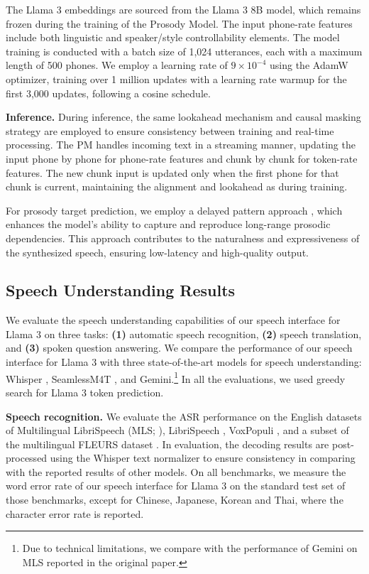 The Llama 3 embeddings are sourced from the Llama 3 8B model, which remains frozen during the training of the Prosody Model. The input phone-rate features include both linguistic and speaker/style controllability elements. The model training is conducted with a batch size of 1,024 utterances, each with a maximum length of 500 phones. We employ a learning rate of \(9 \times 10^{-4}\) using the AdamW optimizer, training over 1 million updates with a learning rate warmup for the first 3,000 updates, following a cosine schedule.

\textbf{Inference.} During inference, the same lookahead mechanism and causal masking strategy are employed to ensure consistency between training and real-time processing. The PM handles incoming text in a streaming manner, updating the input phone by phone for phone-rate features and chunk by chunk for token-rate features. The new chunk input is updated only when the first phone for that chunk is current, maintaining the alignment and lookahead as during training.

For prosody target prediction, we employ a delayed pattern approach \citep{kharitonov2021text}, which enhances the model’s ability to capture and reproduce long-range prosodic dependencies. This approach contributes to the naturalness and expressiveness of the synthesized speech, ensuring low-latency and high-quality output.

\subsection{Speech Understanding Results}
\label{section:results_speech}
We evaluate the speech understanding capabilities of our speech interface for Llama 3 on three tasks: \textbf{(1)} automatic speech recognition, \textbf{(2)} speech translation, and \textbf{(3)} spoken question answering. We compare the performance of our speech interface for Llama 3 with three state-of-the-art models for speech understanding: Whisper \citep{radford23whisper}, SeamlessM4T \citep{barrault2023seamless}, and Gemini.\footnote{
	Due to technical limitations, we compare with the performance of Gemini on MLS reported in the original paper. } In all the evaluations, we used greedy search for Llama 3 token prediction.

\textbf{Speech recognition.} We evaluate the ASR performance on the English datasets of Multilingual LibriSpeech (MLS; \citet{pratap2020mls}),
LibriSpeech \citep{panayotov2015librispeech}, VoxPopuli \citep{wang2021voxpopuli}, and a subset of the multilingual FLEURS dataset \citep{conneau2023fleurs}. In evaluation, the decoding results are post-processed using the Whisper text normalizer to ensure consistency in comparing with the reported results of other models. On all benchmarks, we measure the word error rate of our speech interface for Llama 3 on the standard test set of those benchmarks, except for Chinese, Japanese, Korean and Thai, where the character error rate is reported.

